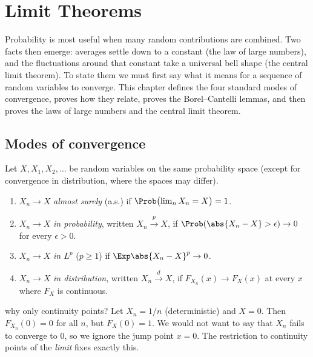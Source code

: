 \chapter{Limit Theorems}
\label{ch:limits}

Probability is most useful when many random contributions are combined. Two
facts then emerge: averages settle down to a constant (the law of large numbers),
and the fluctuations around that constant take a universal bell shape (the
central limit theorem). To state them we must first say what it means for a
sequence of random variables to converge. This chapter defines the four standard
modes of convergence, proves how they relate, proves the Borel--Cantelli lemmas,
and then proves the laws of large numbers and the central limit theorem.

\section{Modes of convergence}

Let $X,X_1,X_2,\dots$ be random variables on the same probability space (except
for convergence in distribution, where the spaces may differ).

\begin{definition}
\begin{enumerate}[label=(\alph*)]
\item $X_n\to X$ \emph{almost surely} (a.s.) if $\Prob\bigl(\lim_nX_n=X\bigr)=1$.
\item $X_n\to X$ \emph{in probability}, written $X_n\xrightarrow{p}X$, if
$\Prob(\abs{X_n-X}>\epsilon)\to0$ for every $\epsilon>0$.
\item $X_n\to X$ \emph{in $L^p$} ($p\ge1$) if $\Exp\abs{X_n-X}^p\to0$.
\item $X_n\to X$ \emph{in distribution}, written $X_n\xrightarrow{d}X$, if
$F_{X_n}(x)\to F_X(x)$ at every $x$ where $F_X$ is continuous.
\end{enumerate}
\end{definition}

\begin{nuance}{why only continuity points?}
Let $X_n=1/n$ (deterministic) and $X=0$. Then $F_{X_n}(0)=0$ for all $n$, but
$F_X(0)=1$. We would not want to say that $X_n$ fails to converge to $0$, so we
ignore the jump point $x=0$. The restriction to continuity points of the \emph{limit}
fixes exactly this.
\end{nuance}

